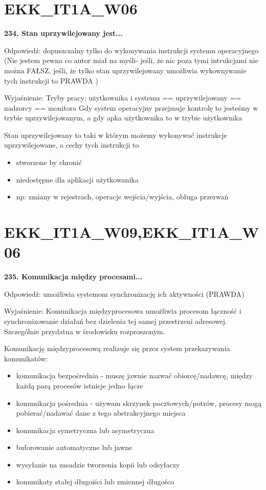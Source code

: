 \section{EKK\_IT1A\_W06}
\textbf{234. Stan uprzywilejowany jest...}

\vspace{0.4cm}

Odpowiedź: dopuszczalny tylko do wykonywania instrukcji systemu operacyjnego (Nie jestem pewna co autor miał na myśli- jeśli, że nic poza tymi intrukcjami nie można FAŁSZ, jeśli,
 że tylko stan uprzywilejowany umożliwia wykownywanie tych instrukcji to PRAWDA )

Wyjaśnienie:
Tryby pracy: użytkownika i systemu == uprzywilejowany == nadzorcy == monitora
Gdy system operacyjny przejmuje kontrolę to jesteśmy w trybie uprzywilejowanym, a gdy apka użytkownika to w trybie użytkownika


Stan uprzywilejowany to taki w którym możemy wykonywać instrukcje uprzywilejowane, a cechy tych instrukcji to
\begin{itemize}
	\item stworzone by chronić
	\item niedostępne dla aplikacji użytkowanika
	\item np: zmiany w rejestrach, operacje wejścia/wyjścia, obługa przerwań
\end{itemize}


\section{EKK\_IT1A\_W09,EKK\_IT1A\_W06}
\textbf{235. Komunikacja między procesami...}

\vspace{0.4cm}

Odpowiedź: umożliwia systemom synchronizację ich aktywności (PRAWDA)

Wyjaśnienie:
Komunikacja międzyprocesowa umożliwia procesom łączność i synchronizowanie działań bez dzielenia tej samej przestrzeni adresowej.
Szczególnie przydatna w środowisku rozproszonym.

Komunikację międzyprocesową realizuje się przez system przekazywania komunikatów:
\begin{itemize}
	\item komunikacja bezpośrednia - muszę jawnie nazwać obiorcę/nadawcę, między każdą parą procesów istnieje jedno łącze
	\item komunikacja pośrednia - używam skrzynek pocztowych/potrów, procesy mogą pobierać/nadawać dane z tego abstrakcyjnego miejsca
	\item komunikacja symetryczna lub asymetryczna
	\item buforowanie automatyczne lub jawne
	\item wysyłanie na zasadzie tworzenia kopii lub odsyłaczy
	\item komunikaty stałej długoiści lub zmiennej długośco
\end{itemize}


